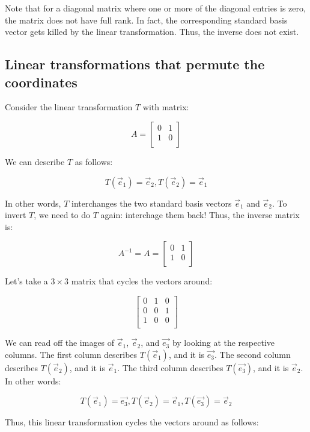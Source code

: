 \documentclass[10pt]{amsart}
\begin{document}
Note that for a diagonal matrix where one or more of the diagonal
entries is zero, the matrix does not have full rank. In fact, the
corresponding standard basis vector gets killed by the linear
transformation. Thus, the inverse does not exist.

\subsection{Linear transformations that permute the coordinates}

Consider the linear transformation $T$ with matrix:

$$A = \left[\begin{matrix} 0 & 1 \\ 1 & 0 \\\end{matrix}\right]$$

We can describe $T$ as follows:

$$T(\vec{e}_1) = \vec{e}_2, T(\vec{e}_2) = \vec{e}_1$$

In other words, $T$ interchanges the two standard basis vectors
$\vec{e}_1$ and $\vec{e}_2$. To invert $T$, we need to do $T$ again:
interchage them back! Thus, the inverse matrix is:

$$A^{-1} = A = \left[\begin{matrix} 0 & 1 \\ 1 & 0 \\\end{matrix}\right]$$

Let's take a $3 \times 3$ matrix that cycles the vectors around:

$$\left[\begin{matrix} 0 & 1 & 0\\ 0 & 0 & 1 \\ 1 & 0 & 0 \\\end{matrix}\right]$$

We can read off the images of $\vec{e}_1$, $\vec{e}_2$, and
$\vec{e_3}$ by looking at the respective columns. The first column
describes $T(\vec{e}_1)$, and it is $\vec{e_3}$. The second column
describes $T(\vec{e}_2)$, and it is $\vec{e}_1$. The third column
describes $T(\vec{e_3})$, and it is $\vec{e}_2$. In other words:

$$T(\vec{e}_1) = \vec{e_3}, T(\vec{e}_2) = \vec{e}_1, T(\vec{e_3}) = \vec{e}_2$$

Thus, this linear transformation cycles the vectors around as follows:
\end{document}
